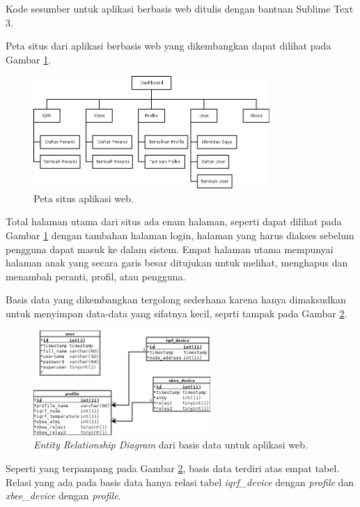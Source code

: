 			Kode sesumber untuk aplikasi berbasis web ditulis dengan bantuan Sublime Text 3.
			
			Peta situs dari aplikasi berbasis web yang dikembangkan dapat dilihat pada Gambar \ref{sitemap}.
			
			\begin{figure}[H]
			  \centering
			    \includegraphics[width=0.8\textwidth]{gambar/sitemap}
			    \caption{Peta situs aplikasi web.}
			    \label{sitemap}
			\end{figure}

			Total halaman utama dari situs ada enam halaman, seperti dapat dilihat pada Gambar \ref{sitemap} dengan tambahan halaman login, halaman yang harus diakses sebelum pengguna dapat masuk ke dalam sistem. Empat halaman utama mempunyai halaman anak yang secara garis besar ditujukan untuk melihat, menghapus dan menambah peranti, profil, atau pengguna.

			Basis data yang dikembangkan tergolong sederhana karena hanya dimaksudkan untuk menyimpan data-data yang sifatnya kecil, seprti tampak pada Gambar \ref{erd}.

			\begin{figure}[H]
			  \centering
			    \includegraphics[width=0.6\textwidth]{gambar/erd}
			    \caption{\emph{Entity Relationship Diagram} dari basis data untuk aplikasi web.}
			    \label{erd}
			\end{figure}

			Seperti yang terpampang pada Gambar \ref{erd}, basis data terdiri atas empat tabel. Relasi yang ada pada basis data hanya relasi tabel \emph{iqrf\_device} dengan \emph{profile} dan \emph{xbee\_device} dengan \emph{profile}.


